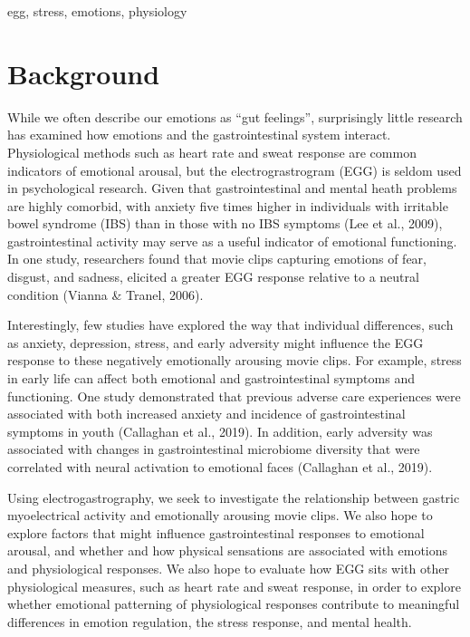 \documentclass[]{book}
\begin{document}
egg, stress, emotions, physiology

\hypertarget{background-1}{%
\section{Background}\label{background-1}}

While we often describe our emotions as ``gut feelings'', surprisingly little research has examined how emotions and the gastrointestinal system interact. Physiological methods such as heart rate and sweat response are common indicators of emotional arousal, but the electrograstrogram (EGG) is seldom used in psychological research. Given that gastrointestinal and mental heath problems are highly comorbid, with anxiety five times higher in individuals with irritable bowel syndrome (IBS) than in those with no IBS symptoms (Lee et al., 2009), gastrointestinal activity may serve as a useful indicator of emotional functioning. In one study, researchers found that movie clips capturing emotions of fear, disgust, and sadness, elicited a greater EGG response relative to a neutral condition (Vianna \& Tranel, 2006).

Interestingly, few studies have explored the way that individual differences, such as anxiety, depression, stress, and early adversity might influence the EGG response to these negatively emotionally arousing movie clips. For example, stress in early life can affect both emotional and gastrointestinal symptoms and functioning. One study demonstrated that previous adverse care experiences were associated with both increased anxiety and incidence of gastrointestinal symptoms in youth (Callaghan et al., 2019). In addition, early adversity was associated with changes in gastrointestinal microbiome diversity that were correlated with neural activation to emotional faces (Callaghan et al., 2019).

Using electrogastrography, we seek to investigate the relationship between gastric myoelectrical activity and emotionally arousing movie clips. We also hope to explore factors that might influence gastrointestinal responses to emotional arousal, and whether and how physical sensations are associated with emotions and physiological responses. We also hope to evaluate how EGG sits with other physiological measures, such as heart rate and sweat response, in order to explore whether emotional patterning of physiological responses contribute to meaningful differences in emotion regulation, the stress response, and mental health.
\end{document}
